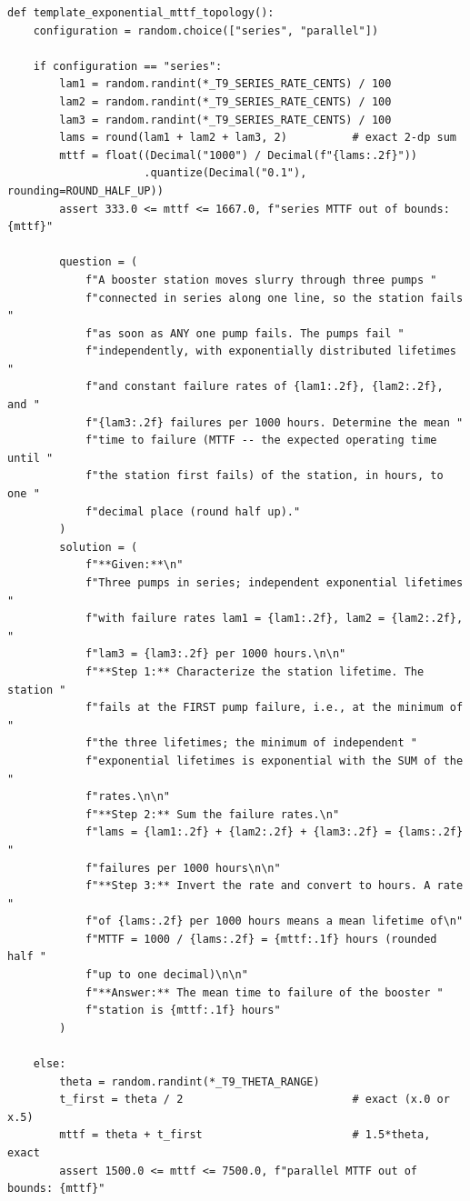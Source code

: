 \begin{lstlisting}[style=pythonstyle]
def template_exponential_mttf_topology():
    configuration = random.choice(["series", "parallel"])

    if configuration == "series":
        lam1 = random.randint(*_T9_SERIES_RATE_CENTS) / 100
        lam2 = random.randint(*_T9_SERIES_RATE_CENTS) / 100
        lam3 = random.randint(*_T9_SERIES_RATE_CENTS) / 100
        lams = round(lam1 + lam2 + lam3, 2)          # exact 2-dp sum
        mttf = float((Decimal("1000") / Decimal(f"{lams:.2f}"))
                     .quantize(Decimal("0.1"), rounding=ROUND_HALF_UP))
        assert 333.0 <= mttf <= 1667.0, f"series MTTF out of bounds: {mttf}"

        question = (
            f"A booster station moves slurry through three pumps "
            f"connected in series along one line, so the station fails "
            f"as soon as ANY one pump fails. The pumps fail "
            f"independently, with exponentially distributed lifetimes "
            f"and constant failure rates of {lam1:.2f}, {lam2:.2f}, and "
            f"{lam3:.2f} failures per 1000 hours. Determine the mean "
            f"time to failure (MTTF -- the expected operating time until "
            f"the station first fails) of the station, in hours, to one "
            f"decimal place (round half up)."
        )
        solution = (
            f"**Given:**\n"
            f"Three pumps in series; independent exponential lifetimes "
            f"with failure rates lam1 = {lam1:.2f}, lam2 = {lam2:.2f}, "
            f"lam3 = {lam3:.2f} per 1000 hours.\n\n"
            f"**Step 1:** Characterize the station lifetime. The station "
            f"fails at the FIRST pump failure, i.e., at the minimum of "
            f"the three lifetimes; the minimum of independent "
            f"exponential lifetimes is exponential with the SUM of the "
            f"rates.\n\n"
            f"**Step 2:** Sum the failure rates.\n"
            f"lams = {lam1:.2f} + {lam2:.2f} + {lam3:.2f} = {lams:.2f} "
            f"failures per 1000 hours\n\n"
            f"**Step 3:** Invert the rate and convert to hours. A rate "
            f"of {lams:.2f} per 1000 hours means a mean lifetime of\n"
            f"MTTF = 1000 / {lams:.2f} = {mttf:.1f} hours (rounded half "
            f"up to one decimal)\n\n"
            f"**Answer:** The mean time to failure of the booster "
            f"station is {mttf:.1f} hours"
        )

    else:
        theta = random.randint(*_T9_THETA_RANGE)
        t_first = theta / 2                          # exact (x.0 or x.5)
        mttf = theta + t_first                       # 1.5*theta, exact
        assert 1500.0 <= mttf <= 7500.0, f"parallel MTTF out of bounds: {mttf}"


\end{lstlisting}
